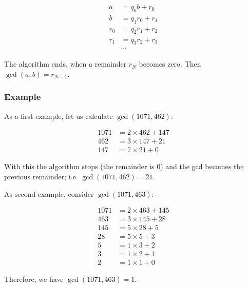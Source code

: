 \begin{align*}
  a &= q_0 b + r_0 \\
  b &= q_1 r_0 + r_1 \\
  r_0 &= q_2 r_1 + r_2 \\
  r_1 &= q_3 r_2 + r_3 \\
  &\cdots  
\end{align*}

The algorithm ends, when a remainder $r_N$ becomes zero. Then $\gcd(a,b) = r_{N-1}$.

\subsubsection{Example}

As a first example, let us calculate $\gcd(1071, 462)$:

\begin{align*}
  1071 &= 2 \times 462 + 147 \\
  462 &= 3 \times 147 + 21 \\
  147 &= 7 \times 21 + 0
\end{align*}

With this the algorithm stops (the remainder is $0$) and the gcd becomes the previous remainder; i.e. $\gcd(1071, 462) = 21$.

As second example, consider $\gcd(1071, 463)$:

\begin{align*}
  1071 &= 2 \times 463 + 145 \\
  463 &= 3 \times 145 + 28 \\
  145 &= 5 \times 28 + 5 \\
  28 &= 5 \times 5 + 3 \\
  5 &= 1 \times 3 + 2 \\
  3 &= 1 \times 2 + 1 \\
  2 &= 1 \times 1 + 0
\end{align*}

Therefore, we have $\gcd(1071, 463) = 1$.
